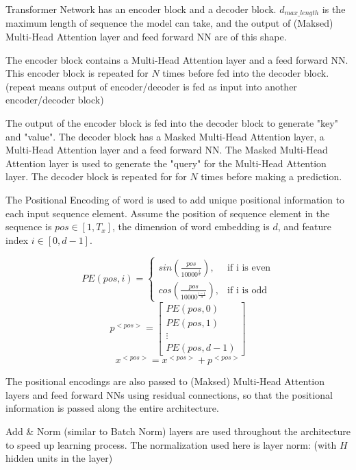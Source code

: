 \documentclass{article}
\begin{document}
\noindent Transformer Network has an encoder block and a decoder block. \(d_{max\_length}\) is the maximum length of sequence the model can take, and the output of (Maksed) Multi-Head Attention layer and feed forward NN are of this shape.

\bigskip

\noindent The encoder block contains a Multi-Head Attention layer and a feed forward NN. This encoder block is repeated for \(N\) times before fed into the decoder block. (repeat means output of encoder/decoder is fed as input into another encoder/decoder block)

\bigskip

\noindent The output of the encoder block is fed into the decoder block to generate "key" and "value". The decoder block has a Masked Multi-Head Attention layer, a Multi-Head Attention layer and a feed forward NN. The Masked Multi-Head Attention layer is used to generate the "query" for the Multi-Head Attention layer. The decoder block is repeated for for \(N\) times before making a prediction.

\bigskip

\noindent The Positional Encoding of word is used to add unique positional information to each input sequence element. Assume the position of sequence element in the sequence is \(pos \in [1, T_{x}]\), the dimension of word embedding is \(d\), and feature index \(i \in [0, d - 1]\).

\[
PE(pos, i) =
\begin{cases}
    sin(\frac{pos}{10000^{\frac{i}{d}}}), & \text{if i is even} \\
    cos(\frac{pos}{10000^{\frac{i - 1}{d}}}), & \text{if i is odd}
\end{cases}
\]
\[
p^{<pos>} =
\begin{bmatrix}
PE(pos, 0) \\
PE(pos, 1) \\
\vdots \\
PE(pos, d - 1)
\end{bmatrix}
\]
\[x^{<pos>} = x^{<pos>} + p^{<pos>}\]

\noindent The positional encodings are also passed to (Maksed) Multi-Head Attention layers and feed forward NNs using residual connections, so that the positional information is passed along the entire architecture.

\bigskip

\noindent Add \& Norm (similar to Batch Norm) layers are used throughout the architecture to speed up learning process. The normalization used here is layer norm: (with \(H\) hidden units in the layer)
\end{document}
